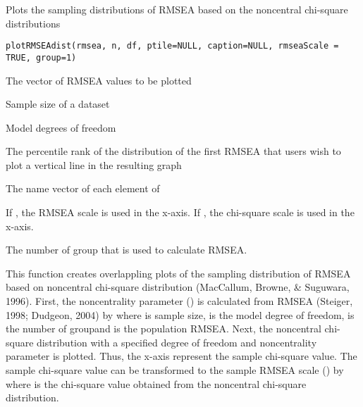 \documentclass[a4paper]{book}
\begin{document}
%
\begin{Description}\relax
Plots the sampling distributions of RMSEA based on the noncentral chi-square distributions
\end{Description}
%
\begin{Usage}
\begin{verbatim}
plotRMSEAdist(rmsea, n, df, ptile=NULL, caption=NULL, rmseaScale = TRUE, group=1)
\end{verbatim}
\end{Usage}
%
\begin{Arguments}
\begin{ldescription}
\item[\code{rmsea}] The vector of RMSEA values to be plotted
\item[\code{n}] Sample size of a dataset
\item[\code{df}] Model degrees of freedom
\item[\code{ptile}] The percentile rank of the distribution of the first RMSEA that users wish to plot a vertical line in the resulting graph
\item[\code{caption}] The name vector of each element of 
\item[\code{rmseaScale}] If , the RMSEA scale is used in the x-axis. If , the chi-square scale is used in the x-axis.
\item[\code{group}] The number of group that is used to calculate RMSEA.

\end{ldescription}
\end{Arguments}
%
\begin{Details}\relax
This function creates overlappling plots of the sampling distribution of RMSEA based on noncentral chi-square distribution (MacCallum, Browne, \& Suguwara, 1996). First, the noncentrality parameter (\eqn{\lambda}{}) is calculated from RMSEA (Steiger, 1998; Dudgeon, 2004) by
where  is sample size,  is the model degree of freedom,  is the number of groupand \eqn{\varepsilon}{} is the population RMSEA. Next, the noncentral chi-square distribution with a specified degree of freedom and noncentrality parameter is plotted. Thus, the x-axis represent the sample chi-square value. The sample chi-square value can be transformed to the sample RMSEA scale (\eqn{\hat{\varepsilon}}{}) by
where  is the chi-square value obtained from the noncentral chi-square distribution.
\end{Details}
\end{document}
